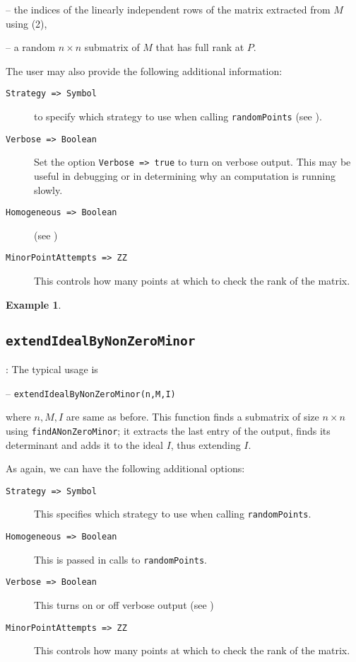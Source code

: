 \documentclass[11pt]{amsart}
\theoremstyle{definition}
\newtheorem{example}{Example}[section]
\begin{document}
	-- the indices of the linearly independent rows of the matrix extracted from $M$ using (2), 
	
	-- a random $n\times n$ submatrix of $M$ that has full rank at $P$.
	
The user may also provide the following additional information: 

\begin{description}
	\item[\tt Strategy => Symbol] to specify which strategy to use when calling {\tt randomPoints} (see ).
	
	\item[\tt Verbose => Boolean]
		 Set the option {\tt Verbose => true} to turn on verbose output.  This may be useful in debugging or in determining why an computation is running slowly.
		 
	\item[\tt Homogeneous => Boolean] (see )
	
	\item[\tt MinorPointAttempts => ZZ] 
		This controls how many points at which to check the rank of the matrix.
\end{description}

\begin{example}
	
\end{example}

\subsection{\tt extendIdealByNonZeroMinor}\label{extendIdealByNonZeroMinor}: The typical usage is 

\vspace{1em}
-- {\tt extendIdealByNonZeroMinor(n,M,I)} 

\vspace{1em}
\noindent where $n,M,I$ are same as before. This function finds a submatrix of size $n\times n$ using {\tt findANonZeroMinor};  
it extracts the last entry of the output, finds its determinant and
adds it to the ideal $I$, thus extending $I$. 


As again, we can have the following additional options:
\begin{description}
\item[\tt Strategy => Symbol] This specifies which strategy to use when calling {\tt randomPoints}.
\item[\tt Homogeneous => Boolean] This is passed in calls to {\tt randomPoints}.
\item[\tt Verbose => Boolean] This turns on or off verbose output (see )
\item[\tt MinorPointAttempts => ZZ] This controls how many points at which to check the rank of the matrix.
\end{description}  
\end{document}
